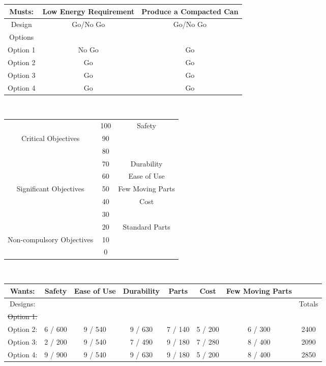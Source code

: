 \begin{center}
  \begin{tabular}[h!]{| c | c | c |}
    \hline
    Musts: & Low Energy Requirement & Produce a Compacted Can\\
    \hline
    Design & Go/No Go & Go/No Go\\
    Options & & \\
    \hline
    Option 1 & No Go & Go\\
    \hline
    Option 2 & Go & Go\\
    \hline
    Option 3 & Go & Go \\
    \hline
    Option 4 & Go & Go\\
    \hline
  \end{tabular}\\
  \vspace{10pt}

  \begin{tabular}[h!]{| c | c | c |}
    \hline
    & 100 & Safety \\
    Critical Objectives & 90 & \\
    & 80 &  \\
    & 70 & Durability \\
    \hline
    & 60 &  Ease of Use\\
    Significant Objectives & 50 & Few Moving Parts\\
    & 40 &   Cost\\
    & 30 & \\
    \hline
    & 20 &  Standard Parts\\
    Non-compulsory Objectives & 10 & \\
    & 0 &  \\
    \hline
  \end{tabular}\\
  \vspace{10pt}

  \begin{tabular}[h!]{| c | c | c | c | c | c | c | c |}
    \hline
    Wants: & Safety & Ease of Use & Durability & Parts & Cost & Few Moving Parts & \\
    \hline
    Designs: &  &  &  &  &  &  & Totals\\
    \hline
    \sout{Option 1:} &  &  &  &  &  &  & \\
    \hline
    Option 2: &  6 / 600 &  9 / 540  & 9 / 630 & 7 / 140 & 5 / 200 & 6 / 300  & 2400\\
    \hline
    Option 3: &  2 / 200 & 9 / 540  & 7 / 490  & 9 / 180  & 7 / 280 & 8 / 400 & 2090 \\
    \hline
    Option 4: &  9 / 900 & 9 / 540 & 9 / 630  & 9 / 180 & 5 / 200  & 8 / 400  & 2850\\
    \hline
  \end{tabular}
\end{center}

